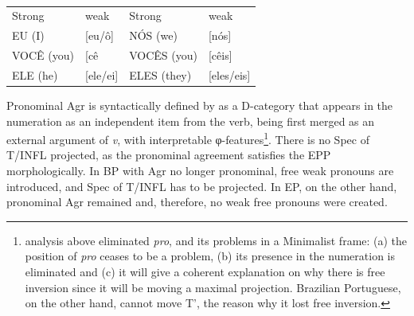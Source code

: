 \documentclass[output=paper]{langsci/langscibook}
\begin{document}
\ea\label{ex:key:26.17}\leavevmode\\[-1\baselineskip]
    \begin{tabular}{llll}
    Strong     & weak     & Strong      & weak \\
    EU (I)     & [eu/ô]   & NÓS (we)    & [nós] \\
    VOCÊ (you) & [cê      & VOCÊS (you) & [cêis] \\
    ELE (he)   & [ele/ei] & ELES (they) & [eles/eis] \\
    \end{tabular}
\z

Pronominal Agr is syntactically defined by \citet{Kato1999} as a D-category
that appears in the numeration as an independent item from the verb, being
first merged as an external argument of \emph{v}, with interpretable
φ-features\footnote{ analysis above eliminated \emph{pro},
    and its problems in a Minimalist frame: (a) the position of \emph{pro}
    ceases to be a problem, (b) its presence in the numeration is eliminated and
    (c) it will give a coherent explanation on why there is free inversion since
it will be moving a maximal projection. Brazilian Portuguese, on the other
hand, cannot move T’, the reason why it lost free inversion.}.  There is no
Spec of T/INFL projected, as the pronominal agreement satisfies the
\gls{EPP} morphologically. In \gls{BP}
with Agr no longer pronominal, free weak pronouns are introduced, and Spec of
T/INFL has to be projected. In \gls{EP}, on the other
hand, pronominal Agr remained and, therefore, no weak free pronouns were
created.
\end{document}
